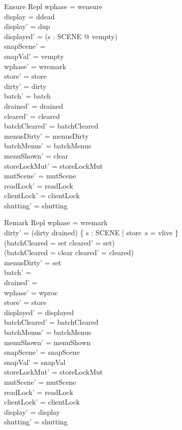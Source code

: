 \documentclass[a4paper,10pt,fleqn]{article}
\begin{document}
\begin{schema}{Ensure}
  \Delta Repl
\where
  wphase = wensure \\
  display = ddead \\
  display' = dup \\
  displayed' = (\lambda s : SCENE @ vempty) \\
  snapScene' = \emptyset \\
  snapVal' = vempty \\
  wphase' = wremark \\
  store' = store \\
  dirty' = dirty \\
  batch' = batch \\
  drained' = drained \\
  cleared' = cleared \\
  batchCleared' = batchCleared \\
  menusDirty' = menusDirty \\
  batchMenus' = batchMenus \\
  menuShown' = clear \\
  storeLockMut' = storeLockMut \\
  mutScene' = mutScene \\
  readLock' = readLock \\
  clientLock' = clientLock \\
  shutting' = shutting
\end{schema}

\begin{schema}{Remark}
  \Delta Repl
\where
  wphase = wremark \\
  dirty' = (dirty \cup drained) \cup \{ s : SCENE | store~s = vlive \} \\
  (batchCleared = set \implies cleared' = set) \\
  (batchCleared = clear \implies cleared' = cleared) \\
  menusDirty' = set \\
  batch' = \emptyset \\
  drained' = \emptyset \\
  wphase' = wproc \\
  store' = store \\
  displayed' = displayed \\
  batchCleared' = batchCleared \\
  batchMenus' = batchMenus \\
  menuShown' = menuShown \\
  snapScene' = snapScene \\
  snapVal' = snapVal \\
  storeLockMut' = storeLockMut \\
  mutScene' = mutScene \\
  readLock' = readLock \\
  clientLock' = clientLock \\
  display' = display \\
  shutting' = shutting
\end{schema}
\end{document}
